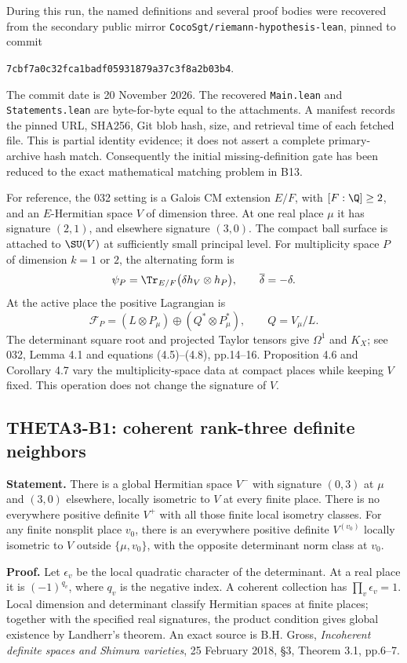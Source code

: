 During this run, the named definitions and several proof bodies were recovered from the secondary public mirror \texttt{CocoSgt/riemann-hypothesis-lean}, pinned to commit
\begin{center}\small\texttt{7cbf7a0c32fca1badf05931879a37c3f8a2b03b4}.\end{center}
The commit date is 20 November 2026. The recovered \texttt{Main.lean} and \texttt{Statements.lean} are byte-for-byte equal to the attachments. A manifest records the pinned URL, SHA256, Git blob hash, size, and retrieval time of each fetched file. This is partial identity evidence; it does not assert a complete primary-archive hash match. Consequently the initial missing-definition gate has been reduced to the exact mathematical matching problem in B13.

For reference, the 032 setting is a Galois CM extension $E/F$, with $[F:\Q]\geq2$, and an $E$-Hermitian space $V$ of dimension three. At one real place $\mu$ it has signature $(2,1)$, and elsewhere signature $(3,0)$. The compact ball surface is attached to $\SU(V)$ at sufficiently small principal level. For multiplicity space $P$ of dimension $k=1$ or $2$, the alternating form is
\[
 \psi_P=\Tr_{E/F}\bigl(\delta h_V\otimes h_P\bigr),
 \qquad \overline\delta=-\delta.
\]
At the active place the positive Lagrangian is
\[
 \mathcal F_P=(L\otimes P_\mu)\oplus(Q^*\otimes P_\mu^*),
 \qquad Q=V_\mu/L.
\]
The determinant square root and projected Taylor tensors give $\Omega^1$ and $K_X$; see 032, Lemma 4.1 and equations (4.5)--(4.8), pp.14--16. Proposition 4.6 and Corollary 4.7 vary the multiplicity-space data at compact places while keeping $V$ fixed. This operation does not change the signature of $V$.

\subsection{THETA3-B1: coherent rank-three definite neighbors}\label{B1}

\textbf{Statement.} There is a global Hermitian space $V^-$ with signature $(0,3)$ at $\mu$ and $(3,0)$ elsewhere, locally isometric to $V$ at every finite place. There is no everywhere positive definite $V^+$ with all those finite local isometry classes. For any finite nonsplit place $v_0$, there is an everywhere positive definite $V^{(v_0)}$ locally isometric to $V$ outside $\{\mu,v_0\}$, with the opposite determinant norm class at $v_0$.

\textbf{Proof.} Let $\epsilon_v$ be the local quadratic character of the determinant. At a real place it is $(-1)^{q_v}$, where $q_v$ is the negative index. A coherent collection has $\prod_v\epsilon_v=1$. Local dimension and determinant classify Hermitian spaces at finite places; together with the specified real signatures, the product condition gives global existence by Landherr's theorem. An exact source is B.H. Gross, \emph{Incoherent definite spaces and Shimura varieties}, 25 February 2018, \S3, Theorem 3.1, pp.6--7.

